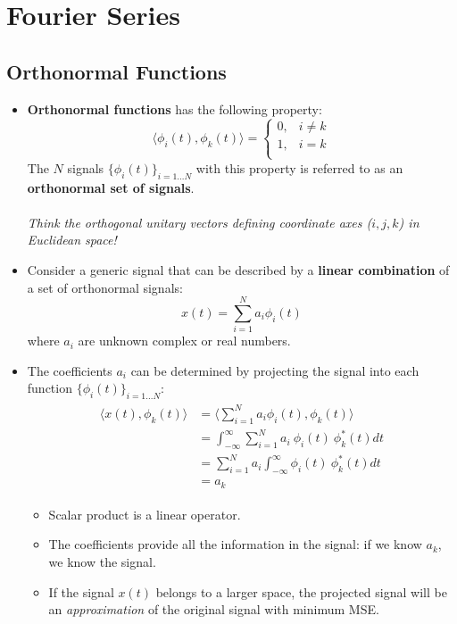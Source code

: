 \section{Fourier Series}
\subsection{Orthonormal Functions}
\begin{itemize}
\item \textbf{Orthonormal functions} has the following property:
\[ \langle \phi_{i}(t), \phi_{k}(t) \rangle = \begin{cases}
0, & i \neq k\\
1, & i = k\\
\end{cases} \]
The $N$ signals $\{ \phi_{i}(t)\}_{i=1...N}$ with this property is referred to as an \textbf{orthonormal set of signals}.\\\\
\textit{Think the orthogonal unitary vectors defining coordinate axes ($i,j,k$) in Euclidean space!}

\item Consider a generic signal that can be described by a \textbf{linear combination} of a set of orthonormal signals:
\[ x(t) = \sum_{i=1}^{N} a_{i} \phi_{i}(t) \]
where $a_{i}$ are unknown complex or real numbers. %
\item The coefficients $a_{i}$ can be determined by projecting the signal into each function $\{ \phi_{i}(t)\}_{i=1...N} $:
\begin{align*}\begin{split}
\langle x(t), \phi_{k}(t) \rangle  &= \langle \sum_{i=1}^{N} a_{i} \phi_{i}(t), \phi_{k}(t) \rangle \\
&= \int_{-\infty}^{\infty} \sum_{i=1}^{N} a_{i} \ \phi_{i}(t) \ \phi_{k}^{*}(t) dt\\
&=\sum_{i=1}^{N} a_{i} \int_{-\infty}^{\infty}\phi_{i}(t) \ \phi_{k}^{*}(t) dt \\
&=a_{k}
\end{split} \end{align*}
 \begin{itemize}
 \item Scalar product is a linear operator.
 \item The coefficients provide all the information in the signal: if we know $a_{k}$, we know the signal.
 \item If the signal $x(t)$ belongs to a larger space, the projected signal will be an \textit{approximation} of the original signal with minimum MSE.
 \end{itemize} \end{itemize}

